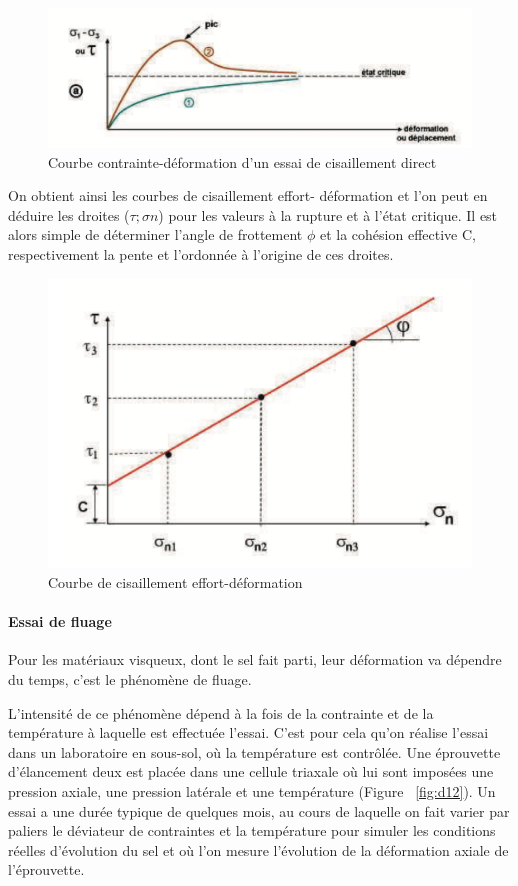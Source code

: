 \documentclass[11pt,french,a4paper]{article}
\begin{document}
\begin{figure}[h]
\centering
\includegraphics[width=.7\linewidth]{image/annexe/annexe_D/D10.png}
\caption{Courbe contrainte-déformation d’un essai de cisaillement direct}
\label{fig:d10}
\end{figure}
\FloatBarrier


On obtient ainsi les courbes de cisaillement effort- déformation et l’on peut en déduire les droites
($\tau ; \sigma n$) pour les valeurs à la rupture et à l’état critique.
Il est alors simple de déterminer l’angle de frottement $\phi$ et la cohésion effective C, respectivement la pente et l’ordonnée à l’origine de ces droites.

\begin{figure}[h]
\centering
\includegraphics[width=.45\linewidth]{image/annexe/annexe_D/D11.png}
\caption{Courbe de cisaillement effort-déformation}
\label{fig:d11}
\end{figure}
\FloatBarrier



\paragraph{Essai de fluage }


Pour les matériaux visqueux, dont le sel fait parti, leur déformation va dépendre du temps, c’est le phénomène de fluage.  

L’intensité de ce phénomène dépend à la fois de la contrainte et de la température à laquelle est effectuée l’essai. C’est pour cela qu’on réalise l'essai dans un laboratoire en sous-sol, où la température est contrôlée. Une éprouvette d’élancement deux est placée dans une cellule triaxale où lui sont imposées une pression axiale, une pression latérale et une température (Figure ~\ref{fig:d12}). Un essai a une durée typique de quelques mois, au cours de laquelle on fait varier par paliers le déviateur de contraintes et la température pour simuler les conditions réelles d’évolution du sel et où l’on mesure l’évolution de la déformation axiale de l’éprouvette. 
\end{document}
